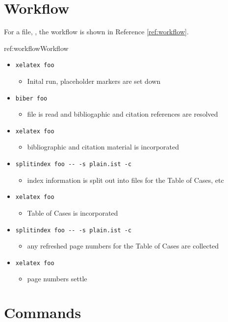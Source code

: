 \section{Workflow}\label{workflow}
For a file, , the workflow is shown in Reference \ref{ref:workflow}.

\begin{dor}{ref:workflow}{Workflow}
\begin{itemize}
\item \verb|xelatex foo|
	\begin{itemize}
	\item Inital run, placeholder markers are set down
	\end{itemize}
\item \verb|biber foo|
	\begin{itemize}
	\item {} file is read and bibliogaphic and citation references are resolved
	\end{itemize}
\item \verb|xelatex foo|
	\begin{itemize}
	\item bibliographic and citation material is incorporated
	\end{itemize}
\item \verb|splitindex foo -- -s plain.ist -c|
	\begin{itemize}
	\item index information is split out into  files for the Table of Cases, etc
	\end{itemize}
\item \verb|xelatex foo|
	\begin{itemize}
	\item Table of Cases is incorporated
	\end{itemize}
\item \verb|splitindex foo -- -s plain.ist -c|
	\begin{itemize}
	\item any refreshed page numbers for the Table of Cases are collected
	\end{itemize}
\item \verb|xelatex foo|
	\begin{itemize}
	\item page numbers settle
	\end{itemize}
\end{itemize}
\end{dor}

\section{Commands}

